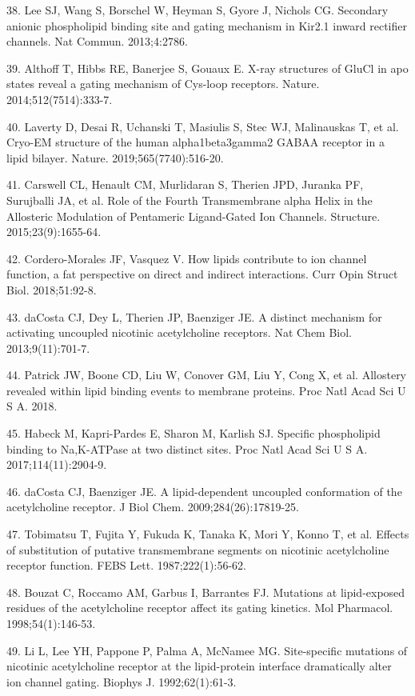 38. Lee SJ, Wang S, Borschel W, Heyman S, Gyore J, Nichols CG. Secondary
anionic phospholipid binding site and gating mechanism in Kir2.1 inward
rectifier channels. Nat Commun. 2013;4:2786.

39. Althoff T, Hibbs RE, Banerjee S, Gouaux E. X-ray structures of GluCl
in apo states reveal a gating mechanism of Cys-loop receptors. Nature.
2014;512(7514):333-7.

40. Laverty D, Desai R, Uchanski T, Masiulis S, Stec WJ, Malinauskas T,
et al. Cryo-EM structure of the human alpha1beta3gamma2 GABAA receptor
in a lipid bilayer. Nature. 2019;565(7740):516-20.

41. Carswell CL, Henault CM, Murlidaran S, Therien JPD, Juranka PF,
Surujballi JA, et al. Role of the Fourth Transmembrane alpha Helix in
the Allosteric Modulation of Pentameric Ligand-Gated Ion Channels.
Structure. 2015;23(9):1655-64.

42. Cordero-Morales JF, Vasquez V. How lipids contribute to ion channel
function, a fat perspective on direct and indirect interactions. Curr
Opin Struct Biol. 2018;51:92-8.

43. daCosta CJ, Dey L, Therien JP, Baenziger JE. A distinct mechanism
for activating uncoupled nicotinic acetylcholine receptors. Nat Chem
Biol. 2013;9(11):701-7.

44. Patrick JW, Boone CD, Liu W, Conover GM, Liu Y, Cong X, et al.
Allostery revealed within lipid binding events to membrane proteins.
Proc Natl Acad Sci U S A. 2018.

45. Habeck M, Kapri-Pardes E, Sharon M, Karlish SJ. Specific
phospholipid binding to Na,K-ATPase at two distinct sites. Proc Natl
Acad Sci U S A. 2017;114(11):2904-9.

46. daCosta CJ, Baenziger JE. A lipid-dependent uncoupled conformation
of the acetylcholine receptor. J Biol Chem. 2009;284(26):17819-25.

47. Tobimatsu T, Fujita Y, Fukuda K, Tanaka K, Mori Y, Konno T, et al.
Effects of substitution of putative transmembrane segments on nicotinic
acetylcholine receptor function. FEBS Lett. 1987;222(1):56-62.

48. Bouzat C, Roccamo AM, Garbus I, Barrantes FJ. Mutations at
lipid-exposed residues of the acetylcholine receptor affect its gating
kinetics. Mol Pharmacol. 1998;54(1):146-53.

49. Li L, Lee YH, Pappone P, Palma A, McNamee MG. Site-specific
mutations of nicotinic acetylcholine receptor at the lipid-protein
interface dramatically alter ion channel gating. Biophys J.
1992;62(1):61-3.

